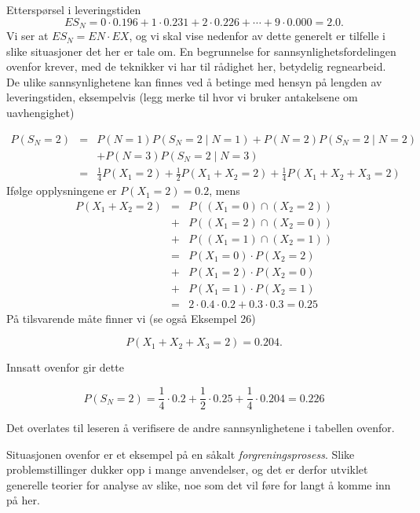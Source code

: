 \begin{eksempel}{Etterspørsel i leveringstiden}
\[ES_N = 0\cdot 0.196 + 1\cdot 0.231 + 2\cdot 0.226 + \cdots +
                                    9\cdot 0.000 = 2.0. \]
\noindent Vi ser at $ES_N=EN\cdot EX$, og vi skal vise nedenfor av dette
generelt er tilfelle i slike situasjoner det her er tale om.
En begrunnelse for sannsynlighetsfordelingen ovenfor krever, med
de teknikker vi har til rådighet her, betydelig regnearbeid. De
ulike sannsynlighetene kan finnes ved å betinge med hensyn på
lengden av leveringstiden, eksempelvis (legg merke til hvor vi
bruker antakelsene om uavhengighet)

\begin{eqnarray*}
P(S_N=2)&=&P(N=1)P(S_N=2 \mid N=1)+P(N=2)P(S_N=2 \mid N=2) \\
        & &+P(N=3)P(S_N=2 \mid N=3) \\
        &=&\frac{1}{4}P(X_1=2)+\frac{1}{2}P(X_1+X_2=2)+
                    \frac{1}{4}P(X_1+X_2+X_3=2) 
\end{eqnarray*}
\noindent Ifølge opplysningene er $P(X_1=2)=0.2$, mens
\begin{eqnarray*}
P(X_1+X_2=2) &=&P((X_1=0)\cap (X_2=2)) \\
             &+&P((X_1=2)\cap (X_2=0)) \\
             &+&P((X_1=1)\cap (X_2=1)) \\
             &=&P(X_1=0)\cdot P(X_2=2)  \\
             &+&P(X_1=2)\cdot P(X_2=0) \\
             &+&P(X_1=1)\cdot P(X_2=1) \\
             &=&2\cdot 0.4\cdot 0.2 + 0.3\cdot 0.3 = 0.25
\end{eqnarray*}
\noindent På tilsvarende måte finner vi (se også Eksempel 26)

\[ P(X_1 + X_2 + X_3 = 2) = 0.204. \]

\noindent Innsatt ovenfor gir dette

\[ P(S_N=2)=\frac{1}{4}\cdot 0.2+\frac{1}{2}\cdot 0.25+
                                   \frac{1}{4}\cdot 0.204=0.226 \]

\noindent Det overlates til leseren å verifisere de andre sannsynlighetene
i tabellen ovenfor.
\end{eksempel}

Situasjonen ovenfor er et eksempel på en såkalt {\em
forgreningsprosess}. Slike problemstillinger dukker opp i mange
anvendelser, og det er derfor utviklet generelle teorier for
analyse av slike, noe som det vil føre for langt å komme inn på
her.

